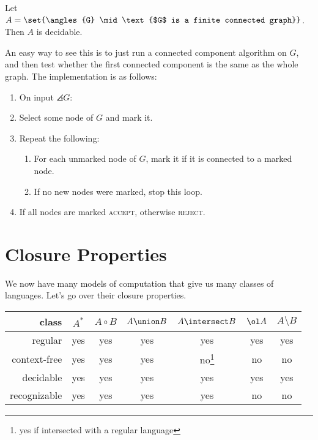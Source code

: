 \documentclass{standalone}
\begin{document}
\begin{example}
	Let \(A = \set{\angles{G} \mid \text{$G$ is a finite connected graph}}\).
  Then \(A\) is decidable.
\end{example}
An easy way to see this is to just run
a connected component algorithm on \(G\),
and then test whether the first connected component
is the same as the whole graph.
The implementation is as follows:
\begin{enumerate}[start=0]
	\item On input \(\angles{G}\):
	\item Select some node of \(G\) and mark it.
	\item Repeat the following:
	\begin{enumerate}[nosep]
		\item For each unmarked node of \(G\),
          mark it if it is connected to a marked node.
		\item If no new nodes were marked, stop this loop.
	\end{enumerate}
	\item If all nodes are marked \textsc{accept}, otherwise \textsc{reject}.
\end{enumerate}

\section{Closure Properties}
We now have many models of computation that give us many classes of languages.
Let's go over their closure properties.

\begin{center}
  \newcommand{\AcapBCTF}{yes if intersected with a regular language}
	\begin{tabular}{r c c c c c c}
    \toprule
		class        & \(A^*\) & \(A \circ B\) & \(A \union B\) & \(A \intersect B\)     & \(\ol A\) & \(A \setminus B\) \\ \midrule
		regular      & yes     & yes           & yes            & yes                    & yes       & yes               \\
		context-free & yes     & yes           & yes            & no\footnote{\AcapBCTF} & no        & no                \\
		decidable    & yes     & yes           & yes            & yes                    & yes       & yes               \\
		recognizable & yes     & yes           & yes            & yes                    & no        & no                \\
    \bottomrule
	\end{tabular}
\end{center}
\end{document}
